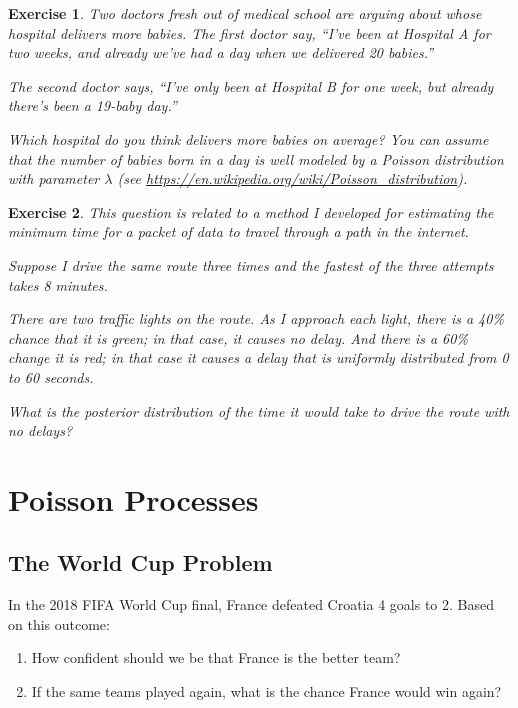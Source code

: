 \documentclass[12pt]{book}
\theoremstyle{exercise}
\newtheorem{exercise}{Exercise}[chapter]
\begin{document}
\begin{exercise}
Two doctors fresh out of medical school are arguing about whose hospital delivers more babies.  The first doctor say, ``I've been at Hospital A for two weeks, and already we've had a day when we delivered 20 babies.''

The second doctor says, ``I've only been at Hospital B for one week, but already there's been a 19-baby day.''

Which hospital do you think delivers more babies on average?  You can assume that the number of babies born in a day is well modeled by a Poisson distribution with parameter $\lambda$ (see \url{https://en.wikipedia.org/wiki/Poisson_distribution}).

\end{exercise}


\begin{exercise}
This question is related to a method I developed for estimating the minimum time for a packet of data to travel through a path in the internet.

Suppose I drive the same route three times and the fastest of the three attempts takes 8 minutes.

There are two traffic lights on the route. As I approach each light, there is a 40\% chance that it is green; in that case, it causes no delay. And there is a 60\% change it is red; in that case it causes a delay that is uniformly distributed from 0 to 60 seconds.

What is the posterior distribution of the time it would take to drive the route with no delays?
\end{exercise}



\chapter{Poisson Processes}
\label{prediction}

\newcommand{\lam}{\mathtt{\lambda}}

\section{The World Cup Problem}

In the 2018 FIFA World Cup final, France defeated Croatia 4 goals to 2.  Based on this outcome:

\begin{enumerate}

\item How confident should we be that France is the better team?

\item If the same teams played again, what is the chance France would win again?

\end{enumerate}
\end{document}
